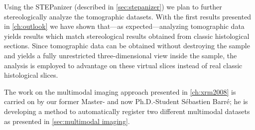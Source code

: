 Using the STEPanizer (described in \autoref{sec:stepanizer}) we plan to further stereologically analyze the tomographic datasets. With the first results presented in \autoref{ch:outlook} we have shown that---as expected---analyzing tomographic data yields results which match stereological results obtained from classic histological sections. Since tomographic data can be obtained without destroying the sample and yields a fully unrestricted three-dimensional view inside the sample, the analysis is employed to advantage on these virtual slices instead of real classic histological slices.

The work on the multimodal imaging approach presented in \autoref{ch:xrm2008} is carried on by our former Master- and now Ph.D.-Student Sébastien Barré; he is developing a method to automatically register two different multimodal datasets as presented in \autoref{sec:multimodal imaging}.
